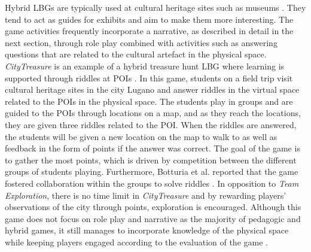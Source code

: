 Hybrid LBGs are typically used at cultural heritage sites such as museums \cite{LBG_Review}. They tend to act as guides for exhibits and aim to make them more interesting. The game activities frequently incorporate a narrative, as described in detail in the next section, through role play combined with activities such as answering questions that are related to the cultural artefact in the physical space. \textit{CityTreasure} is an example of a hybrid treasure hunt LBG where learning is supported through riddles at POIs \cite{botturi2009city}. In this game, students on a field trip visit cultural heritage sites in the city Lugano and answer riddles in the virtual space related to the POIs in the physical space. The students play in groups and are guided to the POIs through locations on a map, and as they reach the locations, they are given three riddles related to the POI. When the riddles are answered, the students will be given a new location on the map to walk to as well as feedback in the form of points if the answer was correct. The goal of the game is to gather the most points, which is driven by competition between the different groups of students playing. Furthermore, Botturia et al. reported that the game fostered collaboration within the groups to solve riddles \cite{botturi2009city}. In opposition to \textit{Team Exploration}, there is no time limit in \textit{CityTreasure} and by rewarding players' observations of the city through points, exploration is encouraged. Although this game does not focus on role play and narrative as the majority of pedagogic and hybrid games, it still manages to incorporate knowledge of the physical space while keeping players engaged according to the evaluation of the game  \cite{botturi2009city}.



